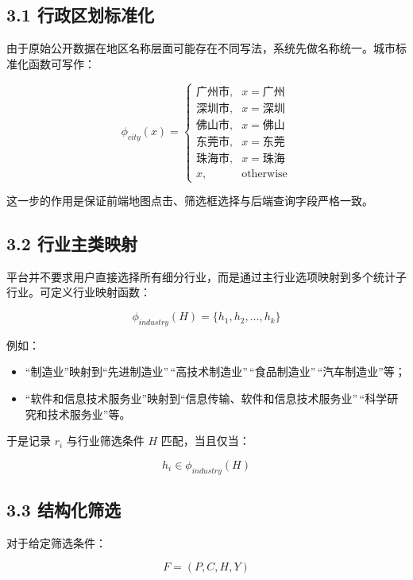\documentclass[
]{article}
\providecommand{\tightlist}{%
  \setlength{\itemsep}{0pt}\setlength{\parskip}{0pt}}
\begin{document}
\subsection{3.1
行政区划标准化}\label{ux884cux653fux533aux5212ux6807ux51c6ux5316}

由于原始公开数据在地区名称层面可能存在不同写法，系统先做名称统一。城市标准化函数可写作：

\[
\phi_{city}(x)=
\begin{cases}
\text{广州市}, & x=\text{广州}\\
\text{深圳市}, & x=\text{深圳}\\
\text{佛山市}, & x=\text{佛山}\\
\text{东莞市}, & x=\text{东莞}\\
\text{珠海市}, & x=\text{珠海}\\
x, & \text{otherwise}
\end{cases}
\]

这一步的作用是保证前端地图点击、筛选框选择与后端查询字段严格一致。

\subsection{3.2
行业主类映射}\label{ux884cux4e1aux4e3bux7c7bux6620ux5c04}

平台并不要求用户直接选择所有细分行业，而是通过主行业选项映射到多个统计子行业。可定义行业映射函数：

\[
\phi_{industry}(H)=\{h_1,h_2,\dots,h_k\}
\]

例如：

\begin{itemize}
\tightlist
\item
  ``制造业''映射到``先进制造业''\,``高技术制造业''\,``食品制造业''\,``汽车制造业''等；
\item
  ``软件和信息技术服务业''映射到``信息传输、软件和信息技术服务业''\,``科学研究和技术服务业''等。
\end{itemize}

于是记录 \(r_i\) 与行业筛选条件 \(H\) 匹配，当且仅当：

\[
h_i \in \phi_{industry}(H)
\]

\subsection{3.3 结构化筛选}\label{ux7ed3ux6784ux5316ux7b5bux9009}

对于给定筛选条件：

\[
F=(P,C,H,Y)
\]
\end{document}
